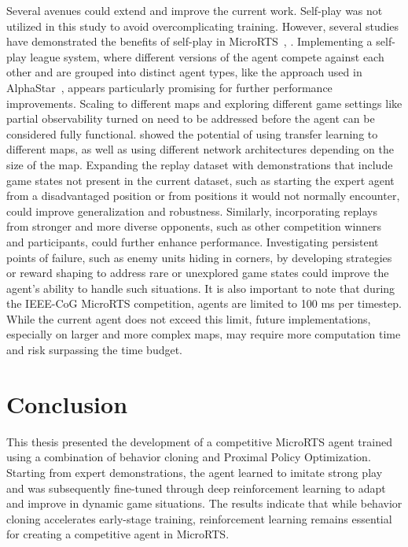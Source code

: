 \documentclass[10pt,twocolumn,letterpaper]{article}
\begin{document}
Several avenues could extend and improve the current work. Self-play was not utilized in this study to avoid overcomplicating training. However, several studies have demonstrated the benefits of self-play in MicroRTS~\cite{goodfriend2024raisocketai}, \cite{huang2021gym}. Implementing a self-play league system, where different versions of the agent compete against each other and are grouped into distinct agent types, like the approach used in AlphaStar~\cite{vinyals2019sc2}, appears particularly promising for further performance improvements.   Scaling to different maps and exploring different game settings like partial observability turned on need to be addressed before the agent can be considered fully functional. \cite{goodfriend2024raisocketai} showed the potential of using transfer learning to different maps, as well as using different network architectures depending on the size of the map. Expanding the replay dataset with demonstrations that include game states not present in the current dataset, such as starting the expert agent from a disadvantaged position or from positions it would not normally encounter, could improve generalization and robustness. Similarly, incorporating replays from stronger and more diverse opponents, such as other competition winners and participants, could further enhance performance. Investigating persistent points of failure, such as enemy units hiding in corners, by developing strategies or reward shaping to address rare or unexplored game states could improve the agent’s ability to handle such situations. It is also important to note that during the IEEE-CoG MicroRTS competition, agents are limited to 100 ms per timestep. While the current agent does not exceed this limit, future implementations, especially on larger and more complex maps, may require more computation time and risk surpassing the time budget. 


\section{Conclusion}
\label{sec:conclusion}

This thesis presented the development of a competitive MicroRTS agent trained using a combination of behavior cloning and Proximal Policy Optimization. Starting from expert demonstrations, the agent learned to imitate strong play and was subsequently fine-tuned through deep reinforcement learning to adapt and improve in dynamic game situations. The results indicate that while behavior cloning accelerates early-stage training, reinforcement learning remains essential for creating a competitive agent in MicroRTS.
\end{document}
